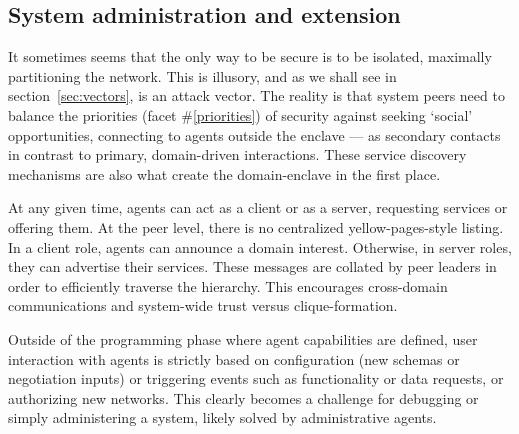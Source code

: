 \begin{ppl}

\end{ppl}


\subsection{System administration and extension}\label{subsec:admin}

It sometimes seems that the only way to be secure is to be isolated, maximally partitioning the network.
This is illusory, and as we shall see in section~\ref{sec:vectors}, is an attack vector.
The reality is that system peers need to balance the priorities (facet \#\ref{priorities}) of security against seeking `social' opportunities, connecting to agents outside the enclave --- as secondary contacts in contrast to primary, domain-driven interactions.
These service discovery mechanisms are also what create the domain-enclave in the first place.

At any given time, agents can act as a client or as a server, requesting services or offering them.
At the peer level, there is no centralized yellow-pages-style listing.
In a client role, agents can announce a domain interest.
Otherwise, in server roles, they can advertise their services.
These messages are collated by peer leaders in order to efficiently traverse the hierarchy.
This encourages cross-domain communications and system-wide trust versus clique-formation.

Outside of the programming phase where agent capabilities are defined, user interaction with agents is strictly based on configuration (new schemas or negotiation inputs) or triggering events such as functionality or data requests, or authorizing new networks.
This clearly becomes a challenge for debugging or simply administering a system, likely solved by administrative agents.

\begin{ppl}

\end{ppl}